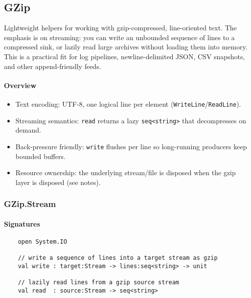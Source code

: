 \documentclass{article}
\begin{document}
\subsection{GZip}

\noindent Lightweight helpers for working with gzip-compressed, line-oriented text. The emphasis is on streaming: you can write an unbounded sequence of lines to a compressed sink, or lazily read large archives without loading them into memory. This is a practical fit for log pipelines, newline-delimited JSON, CSV snapshots, and other append-friendly feeds.

\paragraph{Overview}
\begin{itemize}
  \item Text encoding: UTF-8, one logical line per element (\texttt{WriteLine}/\texttt{ReadLine}).
  \item Streaming semantics: \texttt{read} returns a lazy \texttt{seq<string>} that decompresses on demand.
  \item Back-pressure friendly: \texttt{write} flushes per line so long-running producers keep bounded buffers.
  \item Resource ownership: the underlying stream/file is disposed when the gzip layer is disposed (see notes).
\end{itemize}

\subsubsection{GZip.Stream}

\paragraph{Signatures}
\begin{verbatim}
    open System.IO

    // write a sequence of lines into a target stream as gzip
    val write : target:Stream -> lines:seq<string> -> unit

    // lazily read lines from a gzip source stream
    val read  : source:Stream -> seq<string>
\end{verbatim}
\end{document}
